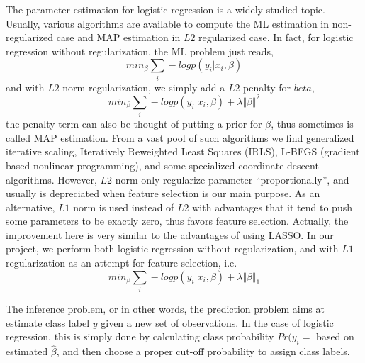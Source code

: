 The parameter estimation for logistic regression is a widely studied topic. Usually, various algorithms are available to compute the ML estimation in non-regularized case and MAP estimation in $L2$ regularized case. In fact, for logistic regression without regularization, the ML problem just reads,
\begin{equation}
min_{\beta} \sum_i -logp(y_i|x_i,\beta)
\end{equation}
and with $L2$ norm regularization, we simply add a $L2$ penalty for $beta$,
\begin{equation}\nonumber
min_{\beta} \sum_i -logp(y_i|x_i,\beta) + \lambda \Vert \beta \Vert^2
\end{equation}
the penalty term can also be thought of putting a prior for $\beta$, thus sometimes is called MAP estimation. From a vast pool of such algorithms we find  generalized iterative scaling, Iteratively Reweighted Least Squares (IRLS), L-BFGS (gradient based nonlinear programming), and some specialized coordinate descent algorithms. However, $L2$ norm only regularize parameter ``proportionally'', and usually is depreciated when feature selection is our main purpose. As an alternative, $L1$ norm is used instead of $L2$ with advantages that it tend to push some parameters to be exactly zero, thus favors feature selection. Actually, the improvement here is very similar to the advantages of using LASSO. In our project, we perform both logistic regression without regularization, and with $L1$ regularization as an attempt for feature selection, i.e.
\begin{equation}\nonumber
min_{\beta} \sum_i -logp(y_i|x_i,\beta) + \lambda \Vert \beta \Vert_1
\end{equation}

The inference problem, or in other words, the prediction problem aims at estimate class label $y$ given a new set of observations. In the case of logistic regression, this is simply done by calculating class probability $Pr(y_i=$ based on estimated $\hat{\beta}$, and then choose a proper cut-off probability to assign class labels. 

